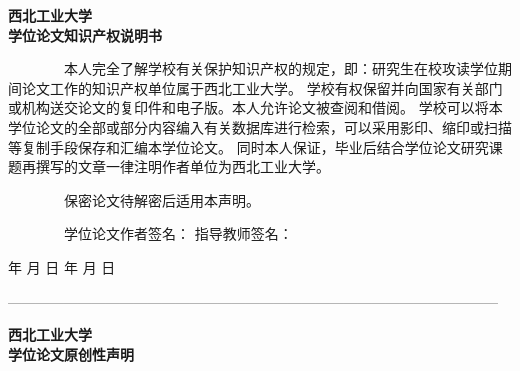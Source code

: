 
\newpage
\thispagestyle{empty}

\vspace*{0.1cm}

\newcommand{\subchapterstyle}{\song\bfseries\fontsize{14pt}{14pt}}
\newcommand{\twospace}{~~~~~~~~}

\begin{center}{\subchapterstyle 西北工业大学 \\ \vspace*{0.1cm} 学位论文知识产权说明书}\end{center}

    {\fontsize{10.5pt}{13pt}\selectfont \twospace 本人完全了解学校有关保护知识产权的规定，即：研究生在校攻读学位期间论文工作的知识产权单位属于西北工业大学。
    学校有权保留并向国家有关部门或机构送交论文的复印件和电子版。本人允许论文被查阅和借阅。
    学校可以将本学位论文的全部或部分内容编入有关数据库进行检索，可以采用影印、缩印或扫描等复制手段保存和汇编本学位论文。
    同时本人保证，毕业后结合学位论文研究课题再撰写的文章一律注明作者单位为西北工业大学。


    \twospace 保密论文待解密后适用本声明。


    \twospace 学位论文作者签名：\underline{\quad\quad\quad\quad\quad\quad\quad} \hspace{8em}指导教师签名：\underline{\quad\quad\quad\quad\quad\quad\quad}

    \hspace{5em} \quad 年 \quad 月 \quad 日 \hspace{17em} 年 \quad 月 \quad 日 \quad}





\vspace{1\baselineskip}
---------------------------------------------------------------------------------------------------------
\vspace{1\baselineskip}

\begin{center}{\subchapterstyle 西北工业大学 \\ \vspace*{0.1cm}学位论文原创性声明}\end{center}

